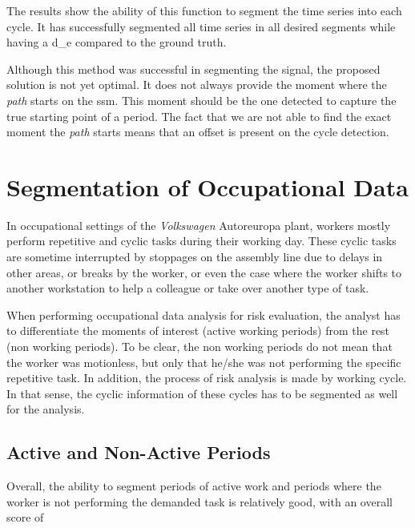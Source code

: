 The results show the ability of this function to segment the time series into each cycle. It has successfully segmented all time series in all desired segments while having a \gls{d_e} compared to the ground truth.
\par
Although this method was successful in segmenting the signal, the proposed solution is not yet optimal. It does not always provide the moment where the \textit{path} starts on the \gls{ssm}. This moment should be the one detected to capture the true starting point of a period. The fact that we are not able to find the exact moment the \textit{path} starts means that an offset is present on the cycle detection.
\par


\section{Segmentation of Occupational Data}

In occupational settings of the \textit{Volkswagen} Autoreuropa plant, workers mostly perform repetitive and cyclic tasks during their working day. These cyclic tasks are sometime interrupted by stoppages on the assembly line due to delays in other areas, or breaks by the worker, or even the case where the worker shifts to another workstation to help a colleague or take over another type of task.
\par
When performing occupational data analysis for risk evaluation, the analyst has to differentiate the moments of interest (active working periods) from the rest (non working periods). To be clear, the non working periods do not mean that the worker was motionless, but only that he/she was not performing the specific repetitive task. In addition, the process of risk analysis is made by working cycle. In that sense, the cyclic information of these cycles has to be segmented as well for the analysis.

\subsection{Active and Non-Active Periods}

Overall, the ability to segment periods of active work and periods where the worker is not performing the demanded task is relatively good, with an overall score of 

